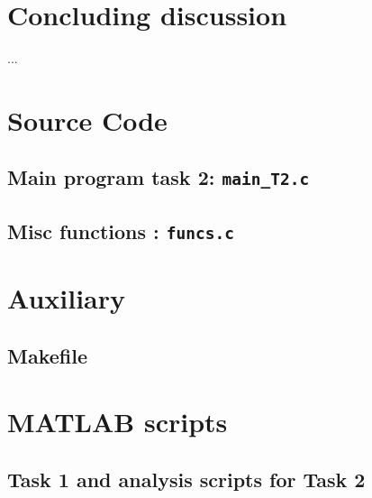 \section*{Concluding discussion}
 ...  
\newpage

\appendix

\section{Source Code}

%

%

\subsection{Main program task 2: \texttt{main\_T2.c}}



\subsection{Misc functions : \texttt{funcs.c}}


\section{Auxiliary }
\subsection{Makefile}


\section{MATLAB scripts}
\subsection{Task 1 and analysis scripts for Task 2}


